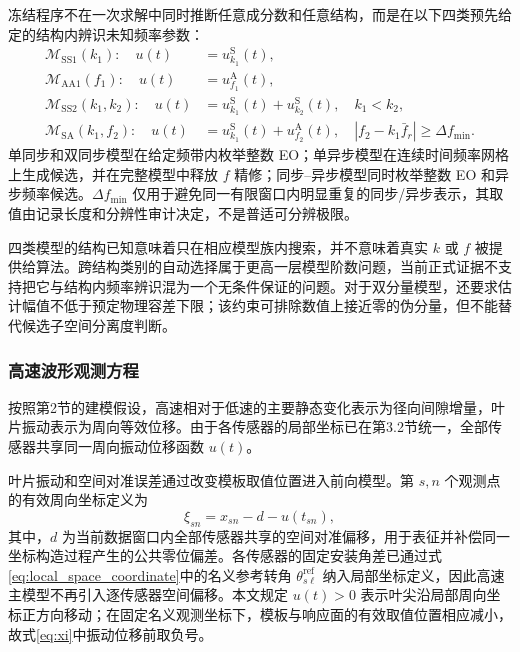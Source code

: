 \documentclass[UTF8,12pt,a4paper]{ctexart}
\begin{document}
冻结程序不在一次求解中同时推断任意成分数和任意结构，而是在以下四类预先给定的结构内辨识未知频率参数：
\begin{align}
\mathcal M_{\mathrm{SS1}}(k_1):\quad
u(t)&=u_{k_1}^{\mathrm S}(t),\label{eq:model_single_sync}\\
\mathcal M_{\mathrm{AA1}}(f_1):\quad
u(t)&=u_{f_1}^{\mathrm A}(t),\label{eq:model_single_async}\\
\mathcal M_{\mathrm{SS2}}(k_1,k_2):\quad
u(t)&=u_{k_1}^{\mathrm S}(t)+u_{k_2}^{\mathrm S}(t),
\quad k_1<k_2,\label{eq:model_dual_sync}\\
\mathcal M_{\mathrm{SA}}(k_1,f_2):\quad
u(t)&=u_{k_1}^{\mathrm S}(t)+u_{f_2}^{\mathrm A}(t),
\quad |f_2-k_1\bar f_r|\geq\Delta f_{\min}.
\label{eq:model_sync_async}
\end{align}
单同步和双同步模型在给定频带内枚举整数 EO；单异步模型在连续时间频率网格上生成候选，并在完整模型中释放 $f$ 精修；同步--异步模型同时枚举整数 EO 和异步频率候选。$\Delta f_{\min}$ 仅用于避免同一有限窗口内明显重复的同步/异步表示，其取值由记录长度和分辨性审计决定，不是普适可分辨极限。

四类模型的结构已知意味着只在相应模型族内搜索，并不意味着真实 $k$ 或 $f$ 被提供给算法。跨结构类别的自动选择属于更高一层模型阶数问题，当前正式证据不支持把它与结构内频率辨识混为一个无条件保证的问题。对于双分量模型，还要求估计幅值不低于预定物理容差下限；该约束可排除数值上接近零的伪分量，但不能替代候选子空间分离度判断。

\subsubsection{高速波形观测方程}

按照第2节的建模假设，高速相对于低速的主要静态变化表示为径向间隙增量，叶片振动表示为周向等效位移。由于各传感器的局部坐标已在第3.2节统一，全部传感器共享同一周向振动位移函数 $u(t)$。

叶片振动和空间对准误差通过改变模板取值位置进入前向模型。第 $s,n$ 个观测点的有效周向坐标定义为
\begin{equation}
\xi_{sn}=x_{sn}-d-u(t_{sn}),
\label{eq:xi}
\end{equation}
其中，$d$ 为当前数据窗口内全部传感器共享的空间对准偏移，用于表征并补偿同一坐标构造过程产生的公共零位偏差。各传感器的固定安装角差已通过式\eqref{eq:local_space_coordinate}中的名义参考转角 $\theta_{s\ell}^{\mathrm{ref}}$ 纳入局部坐标定义，因此高速主模型不再引入逐传感器空间偏移。本文规定 $u(t)>0$ 表示叶尖沿局部周向坐标正方向移动；在固定名义观测坐标下，模板与响应面的有效取值位置相应减小，故式\eqref{eq:xi}中振动位移前取负号。
\end{document}
